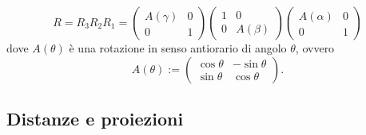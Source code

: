 \documentclass[11pt]{scrartcl}
\begin{document}
   	 $$R=R_3R_2R_1=\begin{pmatrix}
   	 	A(\gamma) & 0 \\
   	 	0 & 1
   	 \end{pmatrix}
   	 \begin{pmatrix}
   	 	1 & 0 \\
   	 	0 & A(\beta)
   	 \end{pmatrix}
   	 \begin{pmatrix}
   	 	A(\alpha) & 0 \\
   	 	0 & 1
   	 \end{pmatrix}
   	 $$
   	 dove $A(\theta)$ è una rotazione in senso antiorario di angolo $\theta$, ovvero
   	 $$A(\theta):=
   	 \begin{pmatrix}
   	 	\cos\theta & -\sin \theta\\
   	 	\sin \theta & \cos \theta
   	 \end{pmatrix}.
   	 $$
   	 \subsection{Distanze e proiezioni}
   	 
\end{document}
